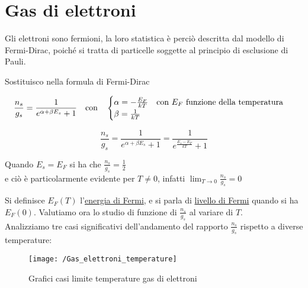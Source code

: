 
\section{Gas di elettroni}

Gli elettroni sono fermioni, la loro statistica è perciò descritta dal modello di Fermi-Dirac, poiché si tratta di particelle soggette al principio di esclusione di Pauli.

Sostituisco nella formula di Fermi-Dirac

\begin{equation}
\frac{n_s}{g_s} = \frac{1}{e^{\alpha + \beta E_s} + 1 } \quad \mbox{con} \quad
	\begin{cases}
		\alpha = - \frac{ E_F}{k T } \quad \mbox{con $E_F$ funzione della temperatura} \\
		\beta = \frac{ 1}{k T }
	\end{cases} \\
\end{equation}

\begin{equation}
\frac{n_s}{g_s} = \frac{1}{e^{\alpha + \beta E_s} + 1 }
= \frac{ 1}{e^{ \frac{ E_s - E_F}{k T } } +1 }
\end{equation}

Quando $E_s = E_F$ si ha che $\frac{ n_s}{g_s } = \frac{ 1}{2 }$ \\
e ciò è particolarmente evidente per $T \not = 0$, infatti $\lim_{T \to 0} \frac{ n_s}{g_s } = 0$

Si definisce $E_F(T)$ l'\underline{energia di Fermi}, e si parla di \underline{livello di Fermi} quando si ha $E_F(0)$. Valutiamo ora lo studio di funzione di $\frac{ n_s}{g_s }$ al variare di $T$. \\

Analizziamo tre casi significativi dell'andamento del rapporto $\frac{ n_s}{g_s }$ rispetto a diverse temperature:

\begin{figure}[h]
\centering
\texttt{[image: /Gas\_elettroni\_temperature]}
\caption{Grafici casi limite temperature gas di elettroni}
\end{figure}

